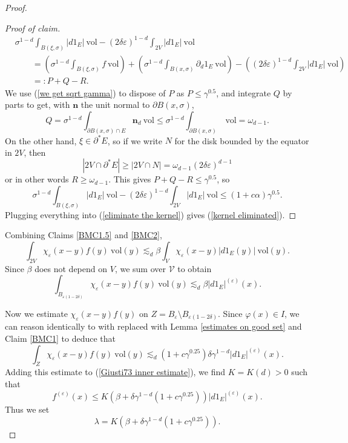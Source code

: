 \documentclass[reqno,12pt,letterpaper]{amsart}
\newcommand{\normal}{\mathbf n}
\newcommand{\vol}{\mathrm{vol}}
\theoremstyle{definition}
\numberwithin{equation}{section}
\begin{document}
\begin{proof}
\begin{proof}[Proof of claim]
\begin{align*}
&\sigma^{1 - d} \int_{B(\xi, \sigma)} |d1_E| ~\vol - (2\delta\varepsilon)^{1 - d} \int_{2V} |d1_E| ~\vol\\
&\qquad = \left(\sigma^{1 - d} \int_{B(\xi, \sigma)} f ~\vol\right) + \left(\sigma^{1 - d} \int_{B(x, \sigma)} \partial_d 1_E ~\vol\right) - \left((2\delta\varepsilon)^{1 - d} \int_{2V} |d1_E| ~\vol\right)\\
&\qquad=: P + Q - R.
\end{align*}
We use (\ref{we get sqrt gamma}) to dispose of $P$ as $P \leq \gamma^{0.5}$, and integrate $Q$ by parts to get, with $\normal$ the unit normal to $\partial B(x, \sigma)$,
$$Q = \sigma^{1 - d} \int_{\partial B(x, \sigma) \cap E} \normal_d ~\vol \leq \sigma^{1 - d} \int_{\partial B(x, \sigma)} ~\vol = \omega_{d - 1}.$$
On the other hand, $\xi \in \partial^* E$, so if we write $N$ for the disk bounded by the equator in $2V$, then
$$|2V \cap \partial^* E| \geq |2V \cap N| = \omega_{d - 1}(2\delta\varepsilon)^{d - 1}$$
or in other words $R \geq \omega_{d - 1}$.
This gives $P + Q - R \leq \gamma^{0.5}$, so
$$\sigma^{1 - d} \int_{B(\xi, \sigma)} |d1_E| ~\vol - (2\delta\varepsilon)^{1 - d} \int_{2V} |d1_E| ~\vol \leq (1 + c\alpha)\gamma^{0.5}.$$
Plugging everything into (\ref{eliminate the kernel}) gives (\ref{kernel eliminated}).
\end{proof}

Combining Claims \ref{BMC1.5} and \ref{BMC2},
$$\int_{2V} \chi_\varepsilon(x - y)f(y) ~\vol(y) \lesssim_d \beta \int_V \chi_\varepsilon(x - y)|d1_E(y)| ~\vol(y).$$
Since $\beta$ does not depend on $V$, we sum over $\mathcal V$ to obtain
\begin{equation}\label{Giusti73 inner estimate}
\int_{B_{\varepsilon(1 - 2\delta)}} \chi_\varepsilon(x - y)f(y) ~\vol(y) \lesssim_d \beta |d1_E|^{(\varepsilon)}(x).
\end{equation}

Now we estimate $\chi_\varepsilon(x - y)f(y)$ on $Z = B_\varepsilon \setminus B_{\varepsilon(1 - 2\delta)}$.
Since $\varphi(x) \in I$, we can reason identically to \cite[p92]{Giusti77} with \cite[(5.14)]{Giusti77} replaced with Lemma \ref{estimates on good set} and Claim \ref{BMC1} to deduce that
$$\int_Z \chi_\varepsilon(x - y)f(y) ~\vol(y) \lesssim_d (1 + c\gamma^{0.25}) \delta \gamma^{1 - d} |d1_E|^{(\varepsilon)}(x).$$
Adding this estimate to (\ref{Giusti73 inner estimate}), we find $K = K(d) > 0$ such that
$$f^{(\varepsilon)}(x) \leq K(\beta + \delta \gamma^{1 - d}(1 + c\gamma^{0.25}))|d1_E|^{(\varepsilon)}(x).$$
Thus we set
$$\lambda = K(\beta + \delta \gamma^{1 - d}(1 + c\gamma^{0.25})).$$


\end{proof}
\end{document}
